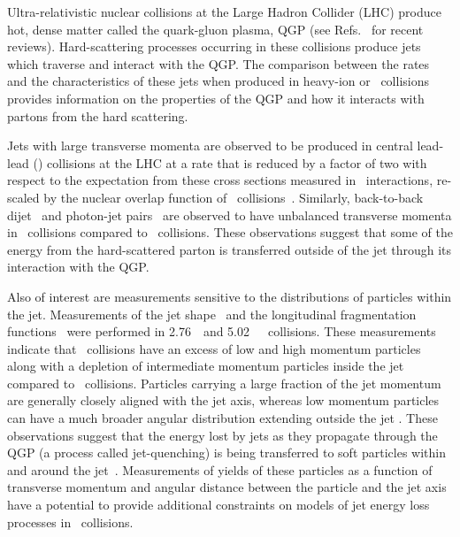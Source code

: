 
Ultra-relativistic nuclear collisions at the Large Hadron Collider (LHC) produce hot, dense matter
called the quark-gluon plasma, QGP (see Refs.~\cite{Roland:2014jsa,Busza:2018rrf} for recent reviews).
Hard-scattering processes occurring in these collisions produce jets which
traverse and interact with the QGP. The comparison between the rates and the characteristics of these jets when produced in heavy-ion or \pp\ collisions provides information on the properties of the QGP and how it interacts with partons from the hard scattering.

Jets with large transverse momenta are observed to be produced in central lead-lead (\pbpb) collisions at the LHC at a rate that is reduced by a factor of two with respect to the expectation from these cross sections measured in \pp\ interactions, re-scaled by the nuclear overlap function of \pbpb\ collisions~\cite{Abelev:2013kqa,Aad:2014bxa,Khachatryan:2016jfl, 2019108}. 
Similarly, back-to-back dijet~\cite{Aad:2010bu,Chatrchyan:2011sx,Aaboud:2017eww} 
and photon-jet pairs~\cite{Chatrchyan:2012gt} are observed to have
unbalanced transverse momenta in \pbpb\ collisions compared to \pp\ collisions.
These observations suggest that some of the energy from the hard-scattered parton is
transferred outside of the jet through its interaction with the QGP.  

Also of interest are measurements sensitive to the distributions of particles
within the jet.  Measurements of the jet shape~\cite{Chatrchyan:2013kwa} and  the longitudinal fragmentation functions~\cite{Aad:2014wha,Chatrchyan:2014ava,Aaboud:2017bzv, PhysRevC.98.024908} were performed in 2.76~\TeV\ and 5.02~\TeV\ \pbpb\
collisions.
These measurements indicate that \pbpb\ collisions have an excess of low and high momentum particles along with a depletion of intermediate momentum particles inside the jet compared to \pp\ collisions. Particles carrying a large fraction of the jet momentum are generally closely
aligned with the jet axis, whereas low momentum particles can have a much broader
angular distribution extending outside the jet \cite{Khachatryan:2016tfj,Sirunyan:2018jqr}. 
These observations suggest that the energy lost by jets as they propagate through the QGP (a process called jet-quenching) is being transferred to soft particles within and around the jet~\cite{Qin:2015srf,Blaizot:2014ula}. Measurements of yields of these particles as a function of transverse momentum and
angular distance between the particle and the jet axis have a potential to provide additional constraints on models of jet energy loss processes in \pbpb\ collisions.

